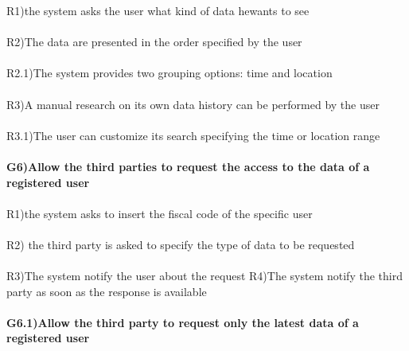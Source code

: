 R1)the system asks the user what kind of data he\she wants to see \\ \\
R2)The data are presented in the order specified by the user  \\ \\
R2.1)The system provides two grouping options: time and location \\ \\
R3)A manual research on its own data history can be performed by the user \\ \\
R3.1)The user can customize its search specifying the time or location range \\ \\ 
\textbf{G6)Allow the third parties to request the access to the data of a registered user} \\ \\
R1)the system asks to insert the fiscal code of the specific user \\ \\
R2) the third party is asked to specify the type of data to be requested\\ \\ 
R3)The system notify the user about the request 
R4)The system notify the third party as soon as the response is available \\ \\
\textbf{G6.1)Allow the third party to request only the latest data of a registered user} \\ \\

